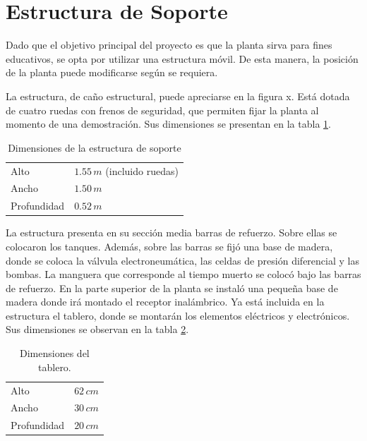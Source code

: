 \section{Estructura de Soporte}
\label{sec:EstructuraSoporte}

Dado que el objetivo principal del proyecto es que la planta sirva para fines
educativos, se opta por utilizar una estructura móvil.
De esta manera, la posición de la planta puede modificarse según se requiera.

La estructura, de caño estructural, puede apreciarse en la figura x.
Está dotada de cuatro ruedas con frenos de seguridad, que permiten fijar la
planta al momento de una demostración.
Sus dimensiones se presentan en la tabla \ref{tab:dimensionesEstructura}.

\begin{table}
\centering
\begin{tabular}{|l|l|}
\hline
Alto & $1.55\,m$ (incluido ruedas)\\
Ancho &  $1.50\,m$\\
Profundidad &  $0.52\,m$\\
\hline
\end{tabular}
\caption{Dimensiones de la estructura de soporte}
\label{tab:dimensionesEstructura}
\end{table}
 
La estructura presenta en su sección media barras de refuerzo.
Sobre ellas se colocaron los tanques.
Además, sobre las barras se fijó una base de madera, donde se coloca la
válvula electroneumática, las celdas de presión diferencial
y las bombas.
La manguera que corresponde al tiempo muerto se colocó bajo
las barras de refuerzo.
En la parte superior de la planta se instaló una pequeña base de
madera donde irá montado el receptor inalámbrico.
Ya está incluida en la estructura el tablero, donde se
montarán los elementos eléctricos y electrónicos.
Sus dimensiones se observan en la tabla \ref{tab:dimensionesTablero}.

\begin{table}
\centering
\begin{tabular}{|l|l|}
\hline
Alto & $62\,cm$\\
Ancho &  $30\,cm$\\
Profundidad &  $20\,cm$\\
\hline
\end{tabular}
\caption{Dimensiones del tablero.}
\label{tab:dimensionesTablero}
\end{table}

